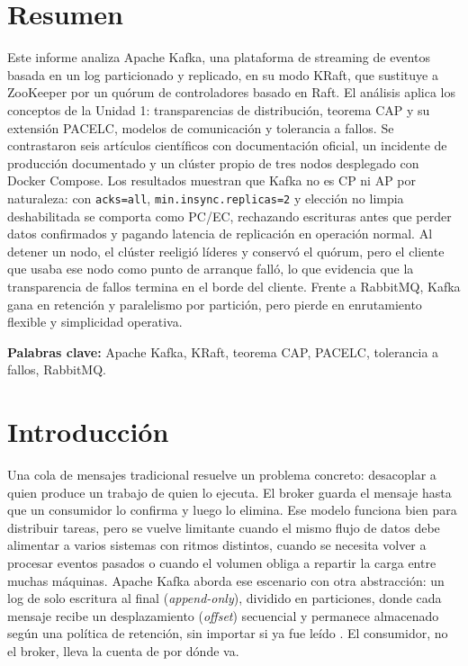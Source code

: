 \documentclass[11pt,a4paper]{article}
\begin{document}
\newpage
\thispagestyle{empty}
\section*{Resumen}

Este informe analiza Apache Kafka, una plataforma de streaming de eventos basada en un log particionado y replicado, en su modo KRaft, que sustituye a ZooKeeper por un quórum de controladores basado en Raft. El análisis aplica los conceptos de la Unidad 1: transparencias de distribución, teorema CAP y su extensión PACELC, modelos de comunicación y tolerancia a fallos. Se contrastaron seis artículos científicos con documentación oficial, un incidente de producción documentado y un clúster propio de tres nodos desplegado con Docker Compose. Los resultados muestran que Kafka no es CP ni AP por naturaleza: con \texttt{acks=all}, \texttt{min.insync.replicas=2} y elección no limpia deshabilitada se comporta como PC/EC, rechazando escrituras antes que perder datos confirmados y pagando latencia de replicación en operación normal. Al detener un nodo, el clúster reeligió líderes y conservó el quórum, pero el cliente que usaba ese nodo como punto de arranque falló, lo que evidencia que la transparencia de fallos termina en el borde del cliente. Frente a RabbitMQ, Kafka gana en retención y paralelismo por partición, pero pierde en enrutamiento flexible y simplicidad operativa.

\vspace{0.4cm}
\noindent\textbf{Palabras clave:} Apache Kafka, KRaft, teorema CAP, PACELC, tolerancia a fallos, RabbitMQ.

\newpage
\setcounter{page}{1}
\setcounter{section}{2}

\section{Introducción}

Una cola de mensajes tradicional resuelve un problema concreto: desacoplar a quien produce un trabajo de quien lo ejecuta. El broker guarda el mensaje hasta que un consumidor lo confirma y luego lo elimina. Ese modelo funciona bien para distribuir tareas, pero se vuelve limitante cuando el mismo flujo de datos debe alimentar a varios sistemas con ritmos distintos, cuando se necesita volver a procesar eventos pasados o cuando el volumen obliga a repartir la carga entre muchas máquinas. Apache Kafka aborda ese escenario con otra abstracción: un log de solo escritura al final (\emph{append-only}), dividido en particiones, donde cada mensaje recibe un desplazamiento (\emph{offset}) secuencial y permanece almacenado según una política de retención, sin importar si ya fue leído \cite{raptis2023survey,kafkadocs}. El consumidor, no el broker, lleva la cuenta de por dónde va.
\end{document}
